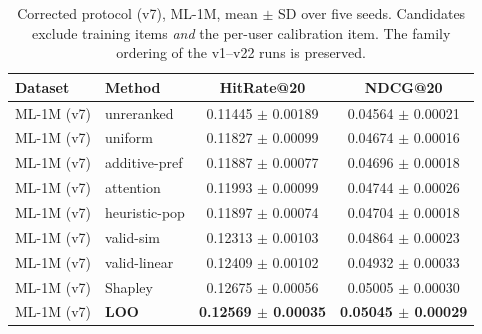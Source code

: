 \documentclass[pdflatex,sn-mathphys-num]{sn-jnl}
\begin{document}
\begin{table}[t]
\caption{Corrected protocol (v7), ML-1M, mean $\pm$ SD over five seeds. Candidates exclude training items \emph{and} the per-user calibration item. The family ordering of the v1--v22 runs is preserved.}\label{tab:v7_main}
\centering
\small
\begin{tabular}{llcc}
\toprule
Dataset & Method & HitRate@20 & NDCG@20 \\
\midrule
ML-1M (v7) & unreranked & 0.11445 $\pm$ 0.00189 & 0.04564 $\pm$ 0.00021 \\
ML-1M (v7) & uniform & 0.11827 $\pm$ 0.00099 & 0.04674 $\pm$ 0.00016 \\
ML-1M (v7) & additive-pref & 0.11887 $\pm$ 0.00077 & 0.04696 $\pm$ 0.00018 \\
ML-1M (v7) & attention & 0.11993 $\pm$ 0.00099 & 0.04744 $\pm$ 0.00026 \\
ML-1M (v7) & heuristic-pop & 0.11897 $\pm$ 0.00074 & 0.04704 $\pm$ 0.00018 \\
ML-1M (v7) & valid-sim & 0.12313 $\pm$ 0.00103 & 0.04864 $\pm$ 0.00023 \\
ML-1M (v7) & valid-linear & 0.12409 $\pm$ 0.00102 & 0.04932 $\pm$ 0.00033 \\
ML-1M (v7) & Shapley & 0.12675 $\pm$ 0.00056 & 0.05005 $\pm$ 0.00030 \\
ML-1M (v7) & \textbf{LOO} & \textbf{0.12569 $\pm$ 0.00035} & \textbf{0.05045 $\pm$ 0.00029} \\
\bottomrule
\end{tabular}
\end{table}
\end{document}
